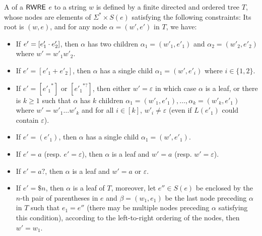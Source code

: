   \begin{definition}
  	A  of a ${\sf RWRE}$ $e$ to a string $w$ is defined by a finite directed and ordered
  	tree $T$, whose nodes are elements of $\Sigma^{\ast} \times S (e)$ satisfying the following constraints: Its root is $(w, e)$, and for any node $\alpha =
  	(w', e')$ in $T$, we have:
  	\begin{itemize}
  		\item If $e' = [e'_1 \cdot e'_2]$, then $\alpha$ has two children $\alpha_1 = (w'_1,
  		e'_1)$ and $\alpha_2=(w'_2, e'_2)$ where $w' = w'_1 w'_2$.
  		
  		\item If $e' = [e'_1 + e'_2]$, then $\alpha$ has a single child $\alpha_1 = (w',
  		e'_i)$ where $i \in \{ 1, 2 \}$.
  		
  		\item If $e' = [{e'_1}^{\ast}]$ or $[{e'_1}^{\ast ?}]$, then either $w' = \varepsilon$ in which case $\alpha$ is a
  		leaf, or there is $k \geqslant 1$ such that $\alpha$ has $k$ children $\alpha_1 = (w'_1,
  		e'_1), \ldots, \alpha_k = (w'_k, e'_1)$ where $w' = w'_1 \ldots w'_k$ and for all
  		$i \in [k]$, $w'_i \neq \varepsilon$ (even if  $L
  		(e'_1)$ could contain $\varepsilon$).
%
%		
  		\item If $e' = (e'_1)$, then $\alpha$ has a single child $\alpha_1 = (w', e'_1)$.
  		\item If $e' = a$ (resp. $e' = \varepsilon$), then $\alpha$ is a leaf and
  		$w' = a$ (resp. $w' = \varepsilon$).
%		
  		\item If $e' = a?$, then $\alpha$ is a leaf and
  		$w' = a$ or $\varepsilon$.
%
		\item If $e' = \$n$, then $\alpha$ is a leaf of $T$, moreover, let $e'' \in S(e)$ be enclosed by the $n$-th pair of parentheses in $e$ and $\beta = (w_1, e_1)$ be the last node preceding $\alpha$ in $T$ such that $e_1 = e''$ (there may be multiple nodes preceding $\alpha$ satisfying this condition), 
		according to the left-to-right ordering of the nodes, then $w' = w_1$.
  	\end{itemize}
  	

\end{definition}
